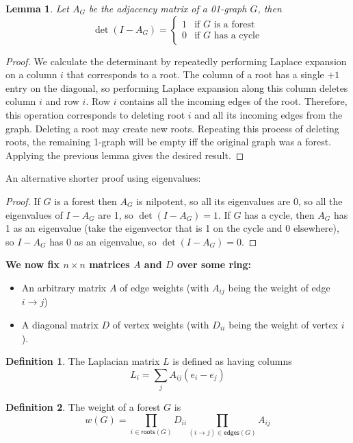 \documentclass[a4paper, 11pt]{article}
\newtheorem{lemma}[theorem]{Lemma}
\theoremstyle{definition}
\newtheorem{definition}{Definition}[section]
\begin{document}
\begin{lemma}
  Let $A_G$ be the adjacency matrix of a 01-graph $G$, then
  \[
    \det(I-A_G) = \begin{cases}
      1 & \text{if $G$ is a forest}\\
      0 & \text{if $G$ has a cycle}
    \end{cases}
  \]
\end{lemma}
\begin{proof}
We calculate the determinant by repeatedly performing Laplace expansion on a column $i$ that corresponds to a root. The column of a root has a single $+1$ entry on the diagonal, so performing Laplace expansion along this column deletes column $i$ and row $i$. Row $i$ contains all the incoming edges of the root. Therefore, this operation corresponds to deleting root $i$ and all its incoming edges from the graph. Deleting a root may create new roots. Repeating this process of deleting roots, the remaining 1-graph will be empty iff the original graph was a forest. Applying the previous lemma gives the desired result.
\end{proof}

An alternative shorter proof using eigenvalues:

\begin{proof}
  If $G$ is a forest then $A_G$ is nilpotent, so all its eigenvalues are $0$, so all the eigenvalues of $I - A_G$ are 1, so $\det(I - A_G) = 1$.
  If $G$ has a cycle, then $A_G$ has 1 as an eigenvalue (take the eigenvector that is 1 on the cycle and 0 elsewhere), so $I - A_G$ has 0 as an eigenvalue, so $\det(I - A_G) = 0$.
\end{proof}

\textbf{We now fix $n\times n$ matrices $A$ and $D$ over some ring:}

\begin{itemize}
  \item An arbitrary matrix $A$ of edge weights (with $A_{ij}$ being the weight of edge $i \to j$)
  \item A diagonal matrix $D$ of vertex weights (with $D_{ii}$ being the weight of vertex $i$).
\end{itemize}

\begin{definition}
  The Laplacian matrix $L$ is defined as having columns
  \[ L_i = \sum_j A_{ij}(e_i - e_j) \]
\end{definition}

\begin{definition}
  The weight of a forest $G$ is \[w(G) = \prod_{i \in \mathsf{roots}(G)} D_{ii} \prod_{(i \to j) \in \mathsf{edges}(G)} A_{ij} \]
\end{definition}
\end{document}
